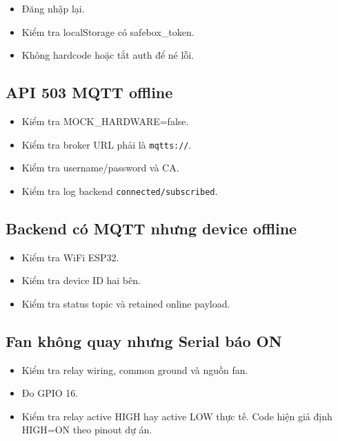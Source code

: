 \documentclass[11pt,oneside,openany]{book}
\renewcommand{\texttt}[1]{{\ttfamily\small #1}}
\providecommand{\tightlist}{\setlength{\itemsep}{1pt}\setlength{\parskip}{0pt}}
\begin{document}
\begin{itemize}
\tightlist
\item
  Đăng nhập lại.
\item
  Kiểm tra localStorage có \texttt{safebox\_token}.
\item
  Không hardcode hoặc tắt auth để né lỗi.
\end{itemize}

\subsection{API 503 MQTT offline}\label{api-503-mqtt-offline}

\begin{itemize}
\tightlist
\item
  Kiểm tra \texttt{MOCK\_HARDWARE=false}.
\item
  Kiểm tra broker URL phải là \nolinkurl{mqtts://}.
\item
  Kiểm tra username/password và CA.
\item
  Kiểm tra log backend \nolinkurl{connected/subscribed}.
\end{itemize}

\subsection{Backend có MQTT nhưng device
offline}\label{backend-cuxf3-mqtt-nhux1b0ng-device-offline}

\begin{itemize}
\tightlist
\item
  Kiểm tra WiFi ESP32.
\item
  Kiểm tra device ID hai bên.
\item
  Kiểm tra status topic và retained online payload.
\end{itemize}

\subsection{Fan không quay nhưng Serial báo
ON}\label{fan-khuxf4ng-quay-nhux1b0ng-serial-buxe1o-on}

\begin{itemize}
\tightlist
\item
  Kiểm tra relay wiring, common ground và nguồn fan.
\item
  Đo GPIO 16.
\item
  Kiểm tra relay active HIGH hay active LOW thực tế. Code hiện giả định
  HIGH=ON theo pinout dự án.
\end{itemize}
\end{document}
